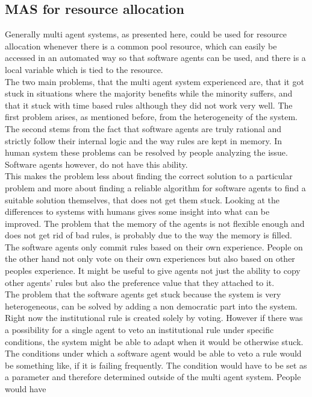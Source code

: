\documentclass[a4paper]{article}
\begin{document}
\subsection{MAS for resource allocation}
Generally multi agent systems, as presented here, could be used for resource allocation whenever there 
is a common pool resource, which can 
easily be accessed in an automated way so that software agents can be used, and there is a local
variable which is tied to the resource. \\
The two main problems, that the multi agent system experienced are, that it got stuck in situations where the majority 
benefits while the minority suffers, and that it stuck with time based rules although they did not work very well.
The first problem arises, as mentioned before, from the heterogeneity of the system. The second stems from the fact that 
software agents are truly rational and strictly follow their internal logic and the way rules are kept in memory. 
In human system these problems can be resolved by people analyzing the issue.
Software agents however, do not have this ability. \\
This makes the problem less about finding the correct solution to a particular problem and more about finding a 
reliable algorithm for software agents to find a suitable solution themselves, that does not get them stuck.  Looking at the 
differences to systems with humans gives some insight into what can be improved. The problem that the memory of the agents is not 
flexible enough and does not get rid of bad rules, is probably due to the way the memory is filled. The software agents only 
commit rules based on their own experience. People on the other hand not only vote on their own experiences but also based on other 
peoples experience. It might be useful to give agents  not just the ability to copy other agents' rules but also the 
preference value that they attached to it. \\
The problem that the software agents get stuck because the system is very heterogeneous, can be solved by adding a non democratic 
part into the system. Right now the institutional rule is created solely by voting. However if there was a possibility for 
a single agent to veto an institutional rule under specific conditions, the system might be able to adapt when it would be otherwise
stuck. The conditions under which a software agent would be able to veto a rule would be something like, if it is failing frequently. 
The condition would have to be set as a parameter and therefore determined outside of the multi agent system. People would have 
\end{document}
